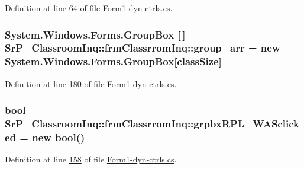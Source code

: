 \-Definition at line \hyperlink{_form1-dyn-ctrls_8cs_source_l00064}{64} of file \hyperlink{_form1-dyn-ctrls_8cs_source}{\-Form1-\/dyn-\/ctrls.\-cs}.

\hypertarget{class_sr_p___classroom_inq_1_1frm_classrrom_inq_a68d2b307c87e71592f6e170c9ce2aad2}{
\subsubsection[{group\-\_\-arr}]{\setlength{\rightskip}{0pt plus 5cm}\-System.\-Windows.\-Forms.\-Group\-Box \mbox{[}$\,$\mbox{]} {\bf \-Sr\-P\-\_\-\-Classroom\-Inq\-::frm\-Classrrom\-Inq\-::group\-\_\-arr} = new \-System.\-Windows.\-Forms.\-Group\-Box\mbox{[}{\bf class\-Size}\mbox{]}}}
\label{class_sr_p___classroom_inq_1_1frm_classrrom_inq_a68d2b307c87e71592f6e170c9ce2aad2}


\-Definition at line \hyperlink{_form1-dyn-ctrls_8cs_source_l00180}{180} of file \hyperlink{_form1-dyn-ctrls_8cs_source}{\-Form1-\/dyn-\/ctrls.\-cs}.

\hypertarget{class_sr_p___classroom_inq_1_1frm_classrrom_inq_a97ab9f8512cd6b2f9648651d5c5d404b}{
\subsubsection[{grpbx\-R\-P\-L\-\_\-\-W\-A\-Sclicked}]{\setlength{\rightskip}{0pt plus 5cm}bool {\bf \-Sr\-P\-\_\-\-Classroom\-Inq\-::frm\-Classrrom\-Inq\-::grpbx\-R\-P\-L\-\_\-\-W\-A\-Sclicked} = new bool()}}
\label{class_sr_p___classroom_inq_1_1frm_classrrom_inq_a97ab9f8512cd6b2f9648651d5c5d404b}


\-Definition at line \hyperlink{_form1-dyn-ctrls_8cs_source_l00158}{158} of file \hyperlink{_form1-dyn-ctrls_8cs_source}{\-Form1-\/dyn-\/ctrls.\-cs}.

